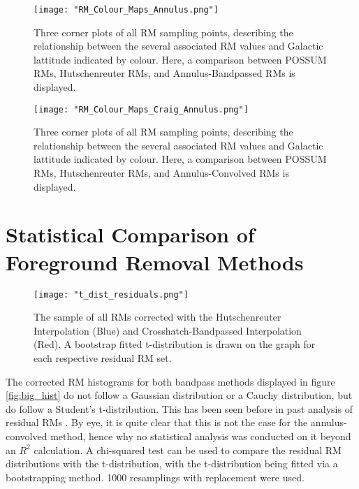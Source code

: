 \begin{figure}
    \texttt{[image: "RM\_Colour\_Maps\_Annulus.png"]}
    \centering
    \caption{Three corner plots of all RM sampling points, describing the relationship between the several associated RM values and Galactic lattitude indicated by colour. Here, a comparison between POSSUM RMs, Hutschenreuter RMs, and Annulus-Bandpassed RMs is displayed.}
    \label{fig:colour_maps_2}
\end{figure}

\begin{figure}
    \texttt{[image: "RM\_Colour\_Maps\_Craig\_Annulus.png"]}
    \centering
    \caption{Three corner plots of all RM sampling points, describing the relationship between the several associated RM values and Galactic lattitude indicated by colour. Here, a comparison between POSSUM RMs, Hutschenreuter RMs, and Annulus-Convolved RMs is displayed.}
    \label{fig:colour_maps_3}
\end{figure}


\section{Statistical Comparison of Foreground Removal Methods}
\label{sec:FR_stats}

\begin{figure}
    \texttt{[image: "t\_dist\_residuals.png"]}
    \centering
    \caption{The sample of all RMs corrected with the Hutschenreuter Interpolation (Blue) and Crosshatch-Bandpassed Interpolation (Red). A bootstrap fitted t-distribution is drawn on the graph for each respective residual RM set.}
    \label{fig:t_dist}
\end{figure}

The corrected RM histograms for both bandpass methods displayed in figure \ref{fig:big_hist} do not follow a Gaussian distribution or a Cauchy distribution, but do follow a Student's t-distribution. This has been seen before in past analysis of residual RMs \citep{ID73}. By eye, it is quite clear that this is not the case for the annulus-convolved method, hence why no statistical analysis was conducted on it beyond an $R^2$ calculation. A chi-squared test can be used to compare the residual RM distributions with the t-distribution, with the t-distribution being fitted via a bootstrapping method. 1000 resamplings with replacement were used.

